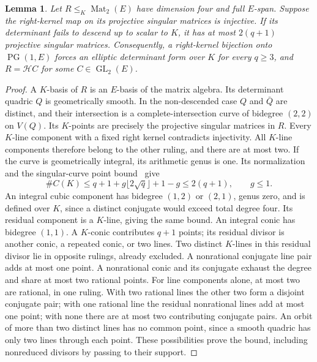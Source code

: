 \documentclass[12pt,letterpaper,onecolumn]{article}
\newtheorem{lemma}[theorem]{Lemma}
\theoremstyle{definition}
\theoremstyle{remark}
\DeclareMathOperator{\GL}{GL}
\DeclareMathOperator{\PG}{PG}
\begin{document}
\begin{lemma}\label{lem:core-right-descent}
Let \(R\le_K\operatorname{Mat}_2(E)\) have dimension four and full \(E\)-span. Suppose the right-kernel map on its projective singular matrices is injective.
If its determinant fails to descend up to scalar to \(K\), it has at most \(2(q+1)\) projective singular matrices.
Consequently, a right-kernel bijection onto \(\PG(1,E)\) forces an elliptic determinant form over \(K\) for every \(q\ge3\), and
\(R=\mathcal H C\) for some \(C\in\GL_2(E)\).
\end{lemma}
\begin{proof}
A \(K\)-basis of \(R\) is an \(E\)-basis of the matrix algebra. Its determinant quadric \(Q\) is geometrically smooth.
In the non-descended case \(Q\) and \(\bar Q\) are distinct, and their intersection is a complete-intersection curve of bidegree \((2,2)\) on \(V(Q)\). Its \(K\)-points are precisely the projective singular matrices in \(R\).
Every \(K\)-line component with a fixed right kernel contradicts injectivity. All \(K\)-line components therefore belong to the other ruling, and there are at most two.
If the curve is geometrically integral, its arithmetic genus is one. Its normalization and the singular-curve point bound~\cite{aubry} give
\[
\#C(K)\le q+1+g\lfloor2\sqrt q\rfloor+1-g\le2(q+1),\qquad g\le1.
\]
An integral cubic component has bidegree \((1,2)\) or \((2,1)\), genus zero, and is defined over \(K\), since a distinct conjugate would exceed total degree four. Its residual component is a \(K\)-line, giving the same bound.
An integral conic has bidegree \((1,1)\). A \(K\)-conic contributes \(q+1\) points; its residual divisor is another conic, a repeated conic, or two lines. Two distinct \(K\)-lines in this residual divisor lie in opposite rulings, already excluded. A nonrational conjugate line pair adds at most one point.
A nonrational conic and its conjugate exhaust the degree and share at most two rational points.
For line components alone, at most two are rational, in one ruling. With two rational lines the other two form a disjoint conjugate pair; with one rational line the residual nonrational lines add at most one point; with none there are at most two contributing conjugate pairs. An orbit of more than two distinct lines has no common point, since a smooth quadric has only two lines through each point.
These possibilities prove the bound, including nonreduced divisors by passing to their support.


\end{proof}
\end{document}
